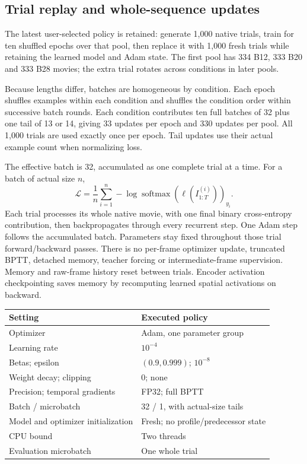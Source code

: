\documentclass[11pt]{article}
\begin{document}
\subsection{Trial replay and whole-sequence updates}

The latest user-selected policy is retained: generate 1,000 native trials, train for ten shuffled epochs over that pool, then replace it with 1,000 fresh trials while retaining the learned model and Adam state. The first pool has 334 B12, 333 B20 and 333 B28 movies; the extra trial rotates across conditions in later pools.

Because lengths differ, batches are homogeneous by condition. Each epoch shuffles examples within each condition and shuffles the condition order within successive batch rounds. Each condition contributes ten full batches of 32 plus one tail of 13 or 14, giving 33 updates per epoch and 330 updates per pool. All 1,000 trials are used exactly once per epoch. Tail updates use their actual example count when normalizing loss.

The effective batch is 32, accumulated as one complete trial at a time. For a batch of actual size $n$,
\[
 \mathcal L=\frac1n\sum_{i=1}^n-\log\operatorname{softmax}(\ell(I_{1:T}^{(i)}))_{y_i}.
\]
Each trial processes its whole native movie, with one final binary cross-entropy contribution, then backpropagates through every recurrent step. One Adam step follows the accumulated batch. Parameters stay fixed throughout those trial forward/backward passes. There is no per-frame optimizer update, truncated BPTT, detached memory, teacher forcing or intermediate-frame supervision. Memory and raw-frame history reset between trials. Encoder activation checkpointing saves memory by recomputing learned spatial activations on backward.

\begin{center}
\begin{tabular}{ll}
\toprule
Setting & Executed policy \\
\midrule
Optimizer & Adam, one parameter group \\
Learning rate & $10^{-4}$ \\
Betas; epsilon & $(0.9,0.999)$; $10^{-8}$ \\
Weight decay; clipping & 0; none \\
Precision; temporal gradients & FP32; full BPTT \\
Batch / microbatch & 32 / 1, with actual-size tails \\
Model and optimizer initialization & Fresh; no profile/predecessor state \\
CPU bound & Two threads \\
Evaluation microbatch & One whole trial \\
\bottomrule
\end{tabular}
\end{center}
\end{document}
